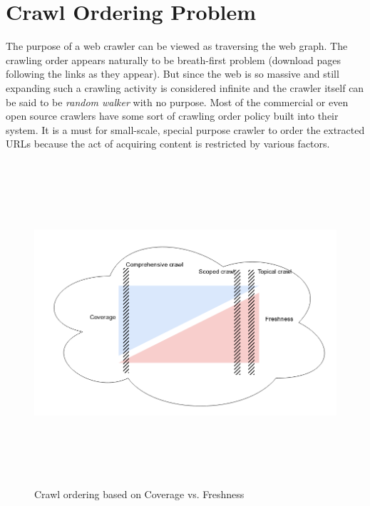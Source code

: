 

\section{Crawl Ordering Problem}\label{covfresh}
The purpose of a web crawler can be viewed as traversing the web graph. The crawling order appears naturally
to be breath-first problem (download pages following the links as they appear). But since the web is so
massive and still expanding such a crawling activity is considered infinite and the crawler itself can
be said to be \textit{random walker} with no purpose. Most of the commercial or even open source crawlers
have some sort of crawling order policy built into their system. It is a must for small-scale, special
purpose crawler to order the extracted URLs because the act of acquiring content is restricted by various
factors.
\begin{figure}[h!]
  \centering
  \includegraphics[width=15cm,height=12cm,keepaspectratio]{../media/crawler/crawl-ordering.png}
  \caption{Crawl ordering based on Coverage vs. Freshness}
  \label{fig:crawlorder}
\end{figure}

